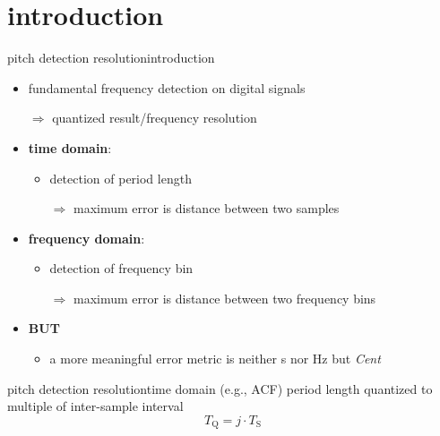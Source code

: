     \section[intro]{introduction}
        \begin{frame}{pitch detection resolution}{introduction}
            \begin{itemize}
                \item fundamental frequency detection on digital signals
                \item[$\Rightarrow$] quantized result/frequency resolution
            \end{itemize}
            
            
            \begin{itemize}
                \item   \textbf{time domain}:
                    \begin{itemize}
                        \item   detection of period length
                        \item[$\Rightarrow$] maximum error is distance between two samples
                    \end{itemize}
                \item<3->   \textbf{frequency domain}:
                    \begin{itemize}
                        \item detection of frequency bin
                        \item[$\Rightarrow$] maximum error is distance between two frequency bins
                    \end{itemize}
                \bigskip
                \item<4->[] \textbf{BUT}
                    \begin{itemize}
                        \item<5->   a more meaningful error metric is neither \unit{s} nor \unit{Hz} but \textit{Cent}
                    \end{itemize}
            \end{itemize}
        \end{frame}
        \begin{frame}{pitch detection resolution}{time domain (e.g., ACF)}
            period length quantized to multiple of inter-sample interval 
            \begin{equation}
                T_\mathrm{Q} = j\cdot T_{\mathrm{S}}
            \end{equation}
        \end{frame}
